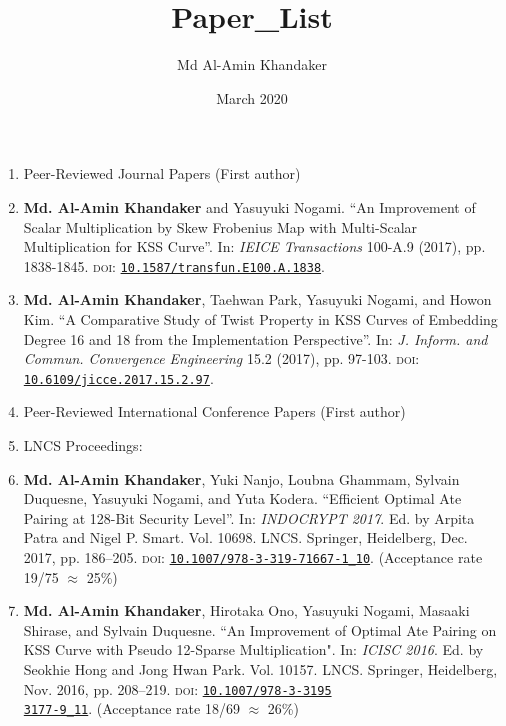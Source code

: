 \documentclass{article}[paper=a4,10pt]
\title{Paper_List}
\author{Md Al-Amin Khandaker}
\date{March 2020}
\begin{document}
\label{research_activity}
\begin{enumerate}
	\Large
	\item[] Peer-Reviewed Journal Papers  (First author)
	\normalsize
	\item \textbf{Md. Al-Amin Khandaker} and Yasuyuki Nogami. “An Improvement of Scalar Multiplication by Skew Frobenius Map with Multi-Scalar Multiplication for KSS Curve”. In: \textit{IEICE Transactions} 100-A.9 (2017), pp. 1838-1845. \textsc{doi}: \href{https://doi.org/10.1587/transfun.E100.A.1838}{\texttt{10.1587/transfun.E100.A.1838}}.
	\normalsize
	\item\textbf{Md. Al-Amin Khandaker}, Taehwan Park, Yasuyuki Nogami, and Howon Kim. “A Comparative Study of Twist Property in KSS Curves of Embedding Degree 16 and 18 from the Implementation Perspective”. In: \textit{J. Inform. and Commun. Convergence Engineering} 15.2 (2017),  pp. 97-103. \textsc{doi}: \href{https://doi.org/10.6109/jicce.2017.15.2.97}{\texttt{10.6109/jicce.2017.15.2.97}}.
	\vspace{10mm}
	\item[ ] \Large Peer-Reviewed International Conference Papers  (First author)
	\normalsize
	\item[ ] \Large LNCS Proceedings:
	\normalsize
	\item \textbf{Md. Al-Amin Khandaker}, Yuki Nanjo, Loubna Ghammam, Sylvain Duquesne, Yasuyuki Nogami, and Yuta Kodera. “Efficient Optimal Ate Pairing at 128-Bit Security Level”. In: \textit{INDOCRYPT 2017}. Ed. by Arpita Patra
	and Nigel P. Smart. Vol. 10698. LNCS. Springer, Heidelberg, Dec. 2017, pp. 186–205. \textsc{doi}: \href{https://doi.org/10.1007/978-3-319-71667-1_10}{\texttt{10.1007/978-3-319-71667-1\_10}}. 	(Acceptance rate 19/75 $\approx$ 25\%)
	
	\item \textbf{Md. Al-Amin Khandaker}, Hirotaka Ono, Yasuyuki Nogami, Masaaki Shirase, and Sylvain Duquesne. ``An Improvement of Optimal Ate Pairing
	on KSS Curve with Pseudo 12-Sparse Multiplication". In: \textit{ICISC 2016}. Ed. by Seokhie Hong and Jong Hwan Park. Vol. 10157. LNCS. Springer, Heidelberg, Nov. 2016, pp. 208–219. \textsc{doi}: \href{https://doi.org/10.1007/978-3-319-53177-9_11}{\texttt{10.1007/978-3-3195\\3177-9\_11}}. 
	(Acceptance rate 18/69 $\approx$ 26\%)
	

\end{enumerate}
\end{document}

